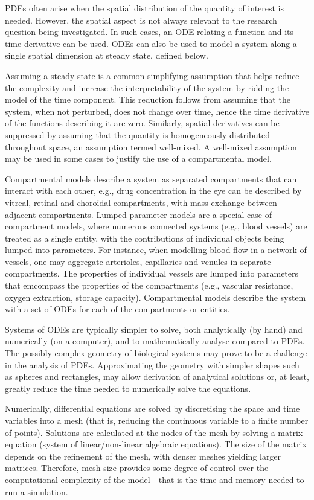 \documentclass{article}
\begin{document}
PDEs often arise when the spatial distribution of the quantity of interest is needed.
However, the spatial aspect is not always relevant to the research question being investigated.
In such cases, an ODE relating a function and its time derivative can be used.
ODEs can also be used to model a system along a single spatial dimension at steady state, defined below.

Assuming a steady state is a common simplifying assumption that helps reduce the complexity and increase the interpretability of the system by ridding the model of the time component.
This reduction follows from assuming that the system, when not perturbed, does not change over time, hence the time derivative of the functions describing it are zero.
Similarly, spatial derivatives can be suppressed by assuming that the quantity is homogeneously distributed throughout space, an assumption termed well-mixed.
A well-mixed assumption may be used in some cases to justify the use of a compartmental model.

Compartmental models describe a system as separated compartments that can interact with each other, e.g., drug concentration in the eye can be described by vitreal, retinal and choroidal compartments, with mass exchange between adjacent compartments.
Lumped parameter models are a special case of compartment models, where numerous connected systems (e.g., blood vessels) are treated as a single entity, with the contributions of individual objects being lumped into parameters.
For instance, when modelling blood flow in a network of vessels, one may aggregate arterioles, capillaries and venules in separate compartments.
The properties of individual vessels are lumped into parameters that emcompass the properties of the compartments (e.g., vascular resistance, oxygen extraction, storage capacity).
Compartmental models describe the system with a set of ODEs for each of the compartments or entities.

Systems of ODEs are typically simpler to solve, both analytically (by hand) and numerically (on a computer), and to mathematically analyse compared to PDEs.
The possibly complex geometry of biological systems may prove to be a challenge in the analysis of PDEs.
Approximating the geometry with simpler shapes such as spheres and rectangles, may allow derivation of analytical solutions or, at least, greatly reduce the time needed to numerically solve the equations.

Numerically, differential equations are solved by discretising the space and time variables into a mesh (that is, reducing the continuous variable to a finite number of points).
Solutions are calculated at the nodes of the mesh by solving a matrix equation (system of linear/non-linear algebraic equations).
The size of the matrix depends on the refinement of the mesh, with denser meshes yielding larger matrices.
Therefore, mesh size provides some degree of control over the computational complexity of the model - that is the time and memory needed to run a simulation.
\end{document}
